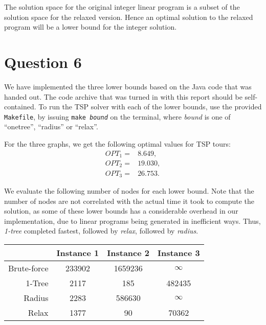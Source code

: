 \documentclass[a4paper, 10pt, oneside, article]{memoir}
\begin{document}
The solution space for the original integer linear program is a subset
of the solution space for the relaxed version. Hence an optimal
solution to the relaxed program will be a lower bound for the integer
solution.


\section*{Question 6}

We have implemented the three lower bounds based on the Java code that
was handed out. The code archive that was turned in with this report
should be self-contained. To run the TSP solver with each of the lower
bounds, use the provided \texttt{Makefile}, by issuing \texttt{make
  \textit{bound}} on the terminal, where \emph{bound} is one of
``onetree'', ``radius'' or ``relax''.


For the three graphs, we get the following optimal values for TSP
tours:
\begin{align*}
  \mathit{OPT}_1 ={}& 8.649, \\
  \mathit{OPT}_2 ={}& 19.030, \\
  \mathit{OPT}_3 ={}& 26.753.
\end{align*}

We evaluate the following number of nodes for each lower bound. Note
that the number of nodes are not correlated with the actual time it
took to compute the solution, as some of these lower bounds has a
considerable overhead in our implementation, due to linear programs
being generated in inefficient ways. Thus, \emph{1-tree} completed
fastest, followed by \emph{relax}, followed by \emph{radius}.

\begin{center}
\begin{tabular}{r | c c c }

 & Instance 1 & Instance 2 & Instance 3 \\
\hline

Brute-force & 233902 & 1659236 & $\infty$ \\

1-Tree      & 2117 & 185 & 482435 \\

Radius      & 2283  & 586630 & $\infty$ \\

Relax       & 1377 & 90 & 70362 \\

\end{tabular}
\end{center}
\end{document}
